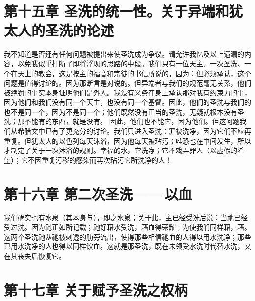 
\section{第十五章 圣洗的统一性。关于异端和犹太人的圣洗的论述}

我不知道是否还有任何问题被提出来使圣洗成为争议。请允许我忆及以上遗漏的内容，以免我似乎打断了即将浮现的思路的中段。我们只有一位天主、一次圣洗、一个在天上的教会，这是按主的福音和宗徒的书信所说的，因为：但必须承认，这个问题是值得讨论的。因为那断言是对说的。但异端者与我们的规范毫无关系，他们被绝罚的事实本身证明他们是外人。我没有义务在身上承认那对我有约束力的事，因为他们和我们没有同一个天主，也没有同一个基督。因此，他们的圣洗与我们的也不是同一个，因为不是同一个；他们既然没有正当的圣洗，无疑就根本没有圣洗；那不能有的东西，就是没有。 因此，他们也不能它，因为他们。但这问题我们从希腊文中已有了更充分的讨论。我们只进入圣洗：罪被洗净，因为它们不应再重复。但犹太人的以色列每天沐浴，因为他每天被玷污；唯恐也在中间发生，所以才制定了关于一次沐浴的规则。幸福的水，它洗净；它不戏弄罪人（以虚假的希望）；它不因重复污秽的感染而再次玷污它所洗净的人！\par


\section{第十六章 第二次圣洗——以血}

我们确实也有水泉（其本身与），即之水泉；关于此，主已经受洗后说：当祂已经受过洗。因为祂正如所记载；祂好藉水受洗，藉血得荣耀；为使我们同样藉，藉。这两个圣洗祂从祂被刺透的肋旁流出，使得那些相信祂血的人得以用水洗净；那些已用水洗净的人也得以同样饮血。这就是那圣洗，既在未领受水洗时代替水洗，又在其丧失后恢复它。\par


\section{第十七章 关于赋予圣洗之权柄}

